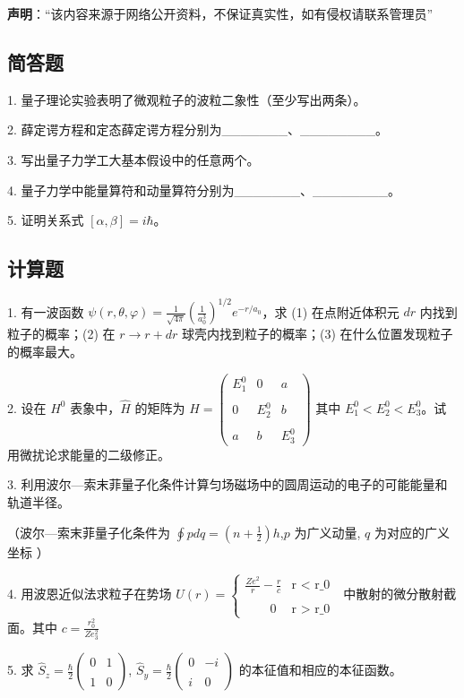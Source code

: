 
\textbf{声明}：“该内容来源于网络公开资料，不保证真实性，如有侵权请联系管理员”

\subsection{简答题}

1. 量子理论实验表明了微观粒子的波粒二象性（至少写出两条）。

2. 薛定谔方程和定态薛定谔方程分别为_______、________。

3. 写出量子力学工大基本假设中的任意两个。

4. 量子力学中能量算符和动量算符分别为_______、________。

5. 证明关系式 $[\alpha, \beta] = i \hbar$。

\subsection{计算题}

1. 有一波函数 $\psi(r, \theta, \varphi) = \frac{1}{\sqrt{4 \pi}} \left( \frac{1}{a_0^3} \right)^{1/2} e^{-r/a_0}$，求 (1) 在点附近体积元 $dr$ 内找到粒子的概率；(2) 在 $r \to r + dr$ 球壳内找到粒子的概率；(3) 在什么位置发现粒子的概率最大。

2. 设在 $H^0$ 表象中，$\hat{H}$ 的矩阵为
$\hat{H} = \begin{pmatrix}E_1^0 & 0 & a \\\\0 & E_2^0 & b \\\\a & b & E_3^0\end{pmatrix}$
其中 $E_1^0 < E_2^0 < E_3^0$。试用微扰论求能量的二级修正。

3. 利用波尔—索末菲量子化条件计算匀场磁场中的圆周运动的电子的可能能量和轨道半径。

（波尔—索末菲量子化条件为 $\oint p dq = (n + \frac{1}{2}) h$,$p$ 为广义动量, $q$ 为对应的广义坐标 ）

4. 用波恩近似法求粒子在势场 $U(r) = \begin{cases} 
\frac{Ze^2}{r} - \frac{r}{c} & \text {r < r_0 }\\\\
\qquad0 & \text{r > r_0 }
\end{cases}$ 中散射的微分散射截面。其中
$c = \frac{r_0^2}{Ze_3^2}$

5. 求 $\hat{S}_z = \frac{\hbar}{2} \begin{pmatrix}
0 & 1 \\\\
1 & 0
\end{pmatrix}$, $\hat{S}_y = \frac{\hbar}{2} \begin{pmatrix}
0 & -i \\\\
i & 0
\end{pmatrix}$ 的本征值和相应的本征函数。

